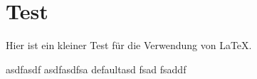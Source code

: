\chapter{Test}
\label{cha:test}

Hier ist ein kleiner Test für die Verwendung von \LaTeX.


asdfasdf
asdfasdfsa
defaultasd
fsad
fsaddf